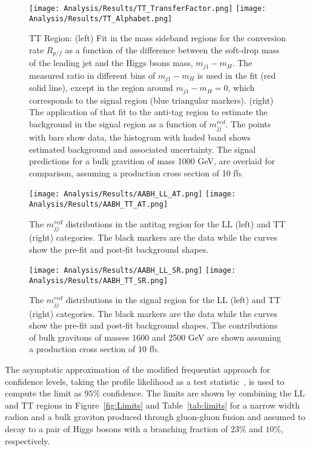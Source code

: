 \begin{figure}[h]
\centering
\texttt{[image: Analysis/Results/TT\_TransferFactor.png]}
\texttt{[image: Analysis/Results/TT\_Alphabet.png]}
\caption{TT Region: (left) Fit in the mass sideband regions for the conversion rate $R_{p/f}$ as a function of the difference between the soft-drop mass of the leading jet and the Higgs bsons mass, $m_{j1}-m_{H}$. The measured ratio in different bins of $m_{j1}-m_{H}$  is used in the fit (red solid line), except in the region around $m_{j1}-m_{H}=0$, which corresponds to the signal region (blue triangular markers). (right) The application of that fit to the anti-tag region to estimate the background in the signal region as a function of $m_{jj}^{red}$. The points with bars show data, the histogram with haded band shows estimated background and associated uncertainty. The signal predictions for a bulk gravition of mass 1000 GeV, are overlaid for comparison, assuming a production cross section of 10 fb.}
\label{fig:AlphabetTT}
\end{figure}

\begin{figure}[h]
\centering
\texttt{[image: Analysis/Results/AABH\_LL\_AT.png]}
\texttt{[image: Analysis/Results/AABH\_TT\_AT.png]}
\caption{The $m_{jj}^{red}$ distributions in the antitag region for the LL (left) and TT (right) categories. The black markers are the data while the curves show the pre-fit and post-fit background shapes.}
\label{fig:AABH_AT}
\end{figure}

\begin{figure}[h]
\centering
\texttt{[image: Analysis/Results/AABH\_LL\_SR.png]}
\texttt{[image: Analysis/Results/AABH\_TT\_SR.png]}
\caption{The $m_{jj}^{red}$ distributions in the signal region for the LL (left) and TT (right) categories. The black markers are the data while the curves show the pre-fit and post-fit background shapes. The contributions of bulk gravitons of masses 1600 and 2500 GeV are shown assuming a production cross section of 10 fb. }
\label{fig:AABH_SR}
\end{figure}

The asymptotic approximation of the modified frequentist approach for confidence levels, taking the profile likelihood as a test statistic~\cite{CLs,CLs2,CLs3}, is used to compute the limit as $95\%$ confidence. The limits are shown by combining the LL and TT regions in Figure~\ref{fig:Limits} and Table~\ref{tab:limits} for a narrow width radion and a bulk graviton produced through gluon-gluon fusion and assumed to decay to a pair of Higgs bosons with a branching fraction of $23\%$ and $10\%$, respectively.

